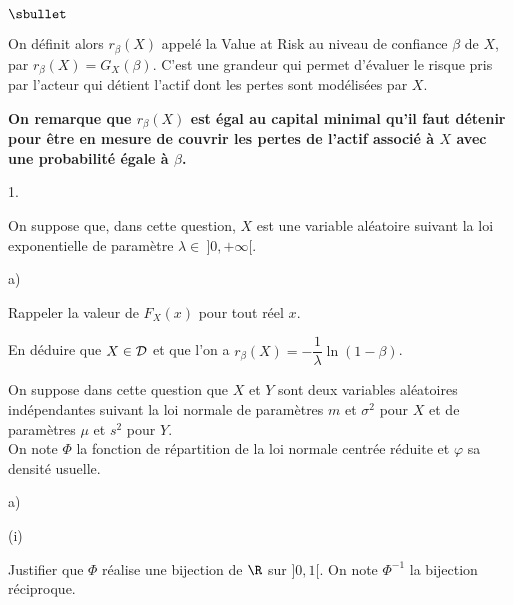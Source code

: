 \documentclass[11pt]{article}%
\begin{document}
\begin{noliste}{$\sbullet$}
  \item On définit alors $r_\beta(X)$ appelé la \og Value at 
  Risk \fg au niveau de confiance $\beta$ de $X$, par 
  $r_\beta(X)=G_X(\beta)$. C'est une grandeur qui permet d'évaluer 
  le risque pris par l'acteur qui détient l'actif dont les pertes 
  sont modélisées par $X$.
  
  \item {\bf On remarque que $r_\beta(X)$ est égal au 
  capital minimal qu'il faut détenir pour être en mesure de 
  couvrir les pertes de l'actif associé à $X$ avec une probabilité 
  égale à $\beta$.}
\end{noliste}

\begin{noliste}{1.}
  \setlength{\itemsep}{4mm}
  \setcounter{enumi}{1}
  \item On suppose que, dans cette question, $X$ est une variable 
  aléatoire suivant la loi exponentielle de paramètre $\lambda \in 
  \ ]0,+\infty[$.
  \begin{noliste}{a)}
    \setlength{\itemsep}{2mm}
    \item Rappeler la valeur de $F_X(x)$ pour tout réel $x$.
    
    

    
    \item En déduire que $X \in {\cal D}$ et que l'on a 
    $r_\beta(X)=-\dfrac1\lambda \ln(1-\beta)$.
    
    

  \end{noliste}

  \item On suppose dans cette question que $X$ et $Y$ sont deux 
  variables aléatoires indépendantes suivant la loi normale de 
  paramètres $m$ et $\sigma^2$ pour $X$ et de paramètres $\mu$ et 
  $s^2$ pour $Y$.\\
  On note $\Phi$ la fonction de répartition de la loi normale 
  centrée réduite et $\varphi$ sa densité usuelle.
  \begin{noliste}{a)}
    \setlength{\itemsep}{2mm}
    \item 
    \begin{nonoliste}{(i)}
      \item Justifier que $\Phi$ réalise une bijection de $\R$ sur 
      $]0,1[$. On note $\Phi^{-1}$ la bijection réciproque.
      
      
      
      
      

\end{nonoliste}
\end{noliste}
\end{noliste}
\end{document}
